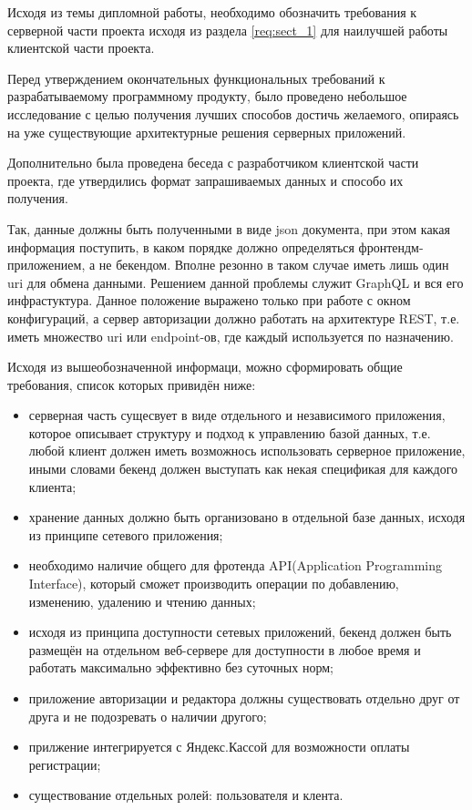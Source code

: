 \label{req:sect_2}

Исходя из темы дипломной работы, необходимо обозначить требования к серверной части проекта исходя из раздела \ref{req:sect_1} для наилучшей работы клиентской части проекта.

Перед утверждением окончательных функциональных требований к разрабатываемому программному продукту, было проведено небольшое исследование с целью получения
лучших способов достичь желаемого, опираясь на уже существующие архитектурные решения серверных приложений.

Дополнительно была проведена беседа с разработчиком клиентской части проекта, где утвердились формат запрашиваемых данных и способо их получения.

Так, данные должны быть полученными в виде json документа, при этом какая информация поступить, в каком порядке должно определяться фронтендм-приложением, а не бекендом.
Вполне резонно в таком случае иметь лишь один uri для обмена данными. Решением данной проблемы служит GraphQL и вся его инфрастуктура. Данное положение выражено только при работе
с окном конфигураций, а сервер авторизации должно работать на архитектуре REST, т.е. иметь множество uri или endpoint-ов, где каждый используется по назначению.

Исходя из вышеобозначенной информаци, можно сформировать общие требования, список которых привидён ниже:
\begin{itemize}
    \item серверная часть сущесвует в виде отдельного и независимого приложения, которое описывает структуру и подход к управлению базой данных, т.е. любой клиент должен иметь возможнось использовать серверное приложение, иными словами бекенд должен выступать как некая спецификая для каждого клиента;
    \item хранение данных должно быть организовано в отдельной базе данных, исходя из принципе сетевого приложения;
    \item необходимо наличие общего для фротенда API(Application Programming Interface), который сможет производить операции по добавлению, изменению, удалению и чтению данных;
    \item исходя из принципа доступности сетевых приложений, бекенд должен быть размещён на отдельном веб-сервере для доступности в любое время и работать максимально эффективно без суточных норм;
    \item приложение авторизации и редактора должны существовать отдельно друг от друга и не подозревать о наличии другого;
    \item прилжение интегрируется с Яндекс.Кассой для возможности оплаты регистрации;
    \item существование отдельных ролей: пользователя и клента.
\end{itemize}
